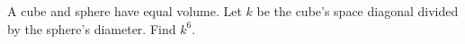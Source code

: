 A cube and sphere have equal volume. Let $k$ be the cube's space diagonal divided by the sphere's diameter. Find $k^6$.
